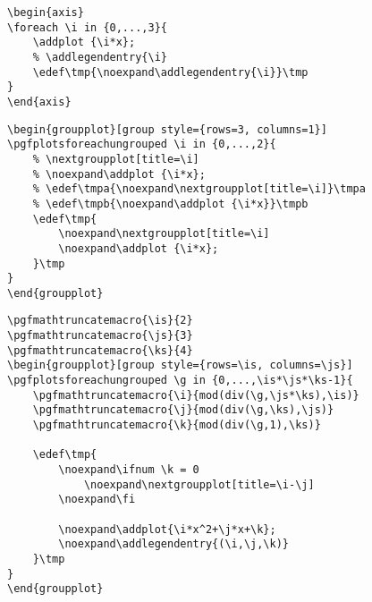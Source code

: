 \documentclass{article}
\begin{document}
\begin{lstlisting}[caption={Works as expected. If we would not forcibly expand \textbackslash i in \textbackslash addlegendentry, all the \textbackslash is would be expanded at \textbackslash end\{axis\}, where they would have the value of \textbackslash i before the loop. If in that case we would instead use \textbackslash pgfplotsforeachungrouped, all the \textbackslash is would be 3.}]
\begin{axis}
\foreach \i in {0,...,3}{
    \addplot {\i*x};
    % \addlegendentry{\i}
    \edef\tmp{\noexpand\addlegendentry{\i}}\tmp
}
\end{axis}
\end{lstlisting}

\begin{lstlisting}[caption={\textcolor{orange}{?}. \textcolor{red}{Avoid separate \textbackslash edefs}. Using \textbackslash foreach would not play nicely with the groups created by \textbackslash nextgroupplot.}]
\begin{groupplot}[group style={rows=3, columns=1}]
\pgfplotsforeachungrouped \i in {0,...,2}{
    % \nextgroupplot[title=\i]
    % \noexpand\addplot {\i*x};
    % \edef\tmpa{\noexpand\nextgroupplot[title=\i]}\tmpa
    % \edef\tmpb{\noexpand\addplot {\i*x}}\tmpb
    \edef\tmp{
        \noexpand\nextgroupplot[title=\i]
        \noexpand\addplot {\i*x};
    }\tmp
}
\end{groupplot}
\end{lstlisting}

\begin{lstlisting}[caption={We could follow multiple approaches: \textcolor{yellow}{i) automatic unrolling}, ii) manual unrolling (I usually have simple cases), iii) nesting \textbackslash edefs (I somehow managed to get it working, but it is very ugly), iv) \href{https://tex.stackexchange.com/questions/130909/changing-parameters-in-a-groupplot}{eappto} (inflexible, extra package, unconventional). \textcolor{orange}{?}. Using \textbackslash foreach would not play nicely with the groups created by \textbackslash nextgroupplot. Moreover, we need \textbackslash pgfplotsforeachungrouped to invoke math parser.}]
\pgfmathtruncatemacro{\is}{2}
\pgfmathtruncatemacro{\js}{3}
\pgfmathtruncatemacro{\ks}{4}
\begin{groupplot}[group style={rows=\is, columns=\js}]
\pgfplotsforeachungrouped \g in {0,...,\is*\js*\ks-1}{
    \pgfmathtruncatemacro{\i}{mod(div(\g,\js*\ks),\is)}
    \pgfmathtruncatemacro{\j}{mod(div(\g,\ks),\js)}
    \pgfmathtruncatemacro{\k}{mod(div(\g,1),\ks)}

    \edef\tmp{
        \noexpand\ifnum \k = 0
            \noexpand\nextgroupplot[title=\i-\j]
        \noexpand\fi

        \noexpand\addplot{\i*x^2+\j*x+\k};
        \noexpand\addlegendentry{(\i,\j,\k)}
    }\tmp
}
\end{groupplot}
\end{lstlisting}
\end{document}
